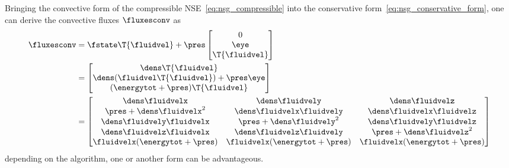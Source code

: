 \documentclass[../main.tex]{subfiles}
\begin{document}
Bringing the convective form of the compressible \ac{NSE}~\eqref{eq:nsg_compressible} into the conservative form~\eqref{eq:nsg_conservative_form}, one can derive the convective fluxes $\fluxesconv$ as
\begin{align}\label{eq:fluxesconv}
\fluxesconv
&=
\fstate \T{\fluidvel} + \pres
\begin{bmatrix}
0\\ \eye \\ \T{\fluidvel}
\end{bmatrix} \\
  &=
	\begin{bmatrix}
	  \dens \T{\fluidvel} \\
	  \dens(\fluidvel \T{\fluidvel} ) + \pres \eye \\
	  (\energytot+\pres) \T{\fluidvel}
	\end{bmatrix} \\
	  &=
	  \begin{bmatrix}
	  \dens \fluidvelx             &  \dens\fluidvely              &  \dens\fluidvelz             \\
	  \pres+\dens\fluidvelx^{2}    &  \dens\fluidvelx\fluidvely    &  \dens\fluidvelx\fluidvelz   \\
	  \dens\fluidvely\fluidvelx    &  \pres+\dens\fluidvely^{2}    &  \dens\fluidvely\fluidvelz   \\
	  \dens\fluidvelz\fluidvelx    &  \dens\fluidvelz\fluidvely    &  \pres+\dens\fluidvelz^{2}   \\
	  \fluidvelx(\energytot+\pres) &  \fluidvelx(\energytot+\pres) & \fluidvelx(\energytot+\pres) \\
	  \end{bmatrix}
\end{align}
depending on the algorithm, one or another form can be advantageous.
\end{document}
